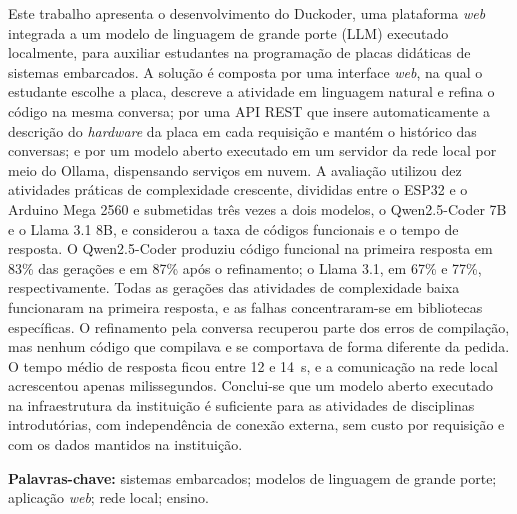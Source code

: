 
\begin{resumo}
  Este trabalho apresenta o desenvolvimento do Duckoder, uma plataforma \textit{web} integrada a um modelo de linguagem de grande porte (LLM) executado localmente, para auxiliar estudantes na programação de placas didáticas de sistemas embarcados. A solução é composta por uma interface \textit{web}, na qual o estudante escolhe a placa, descreve a atividade em linguagem natural e refina o código na mesma conversa; por uma API REST que insere automaticamente a descrição do \textit{hardware} da placa em cada requisição e mantém o histórico das conversas; e por um modelo aberto executado em um servidor da rede local por meio do Ollama, dispensando serviços em nuvem. A avaliação utilizou dez atividades práticas de complexidade crescente, divididas entre o ESP32 e o Arduino Mega 2560 e submetidas três vezes a dois modelos, o Qwen2.5-Coder 7B e o Llama 3.1 8B, e considerou a taxa de códigos funcionais e o tempo de resposta. O Qwen2.5-Coder produziu código funcional na primeira resposta em 83\% das gerações e em 87\% após o refinamento; o Llama 3.1, em 67\% e 77\%, respectivamente. Todas as gerações das atividades de complexidade baixa funcionaram na primeira resposta, e as falhas concentraram-se em bibliotecas específicas. O refinamento pela conversa recuperou parte dos erros de compilação, mas nenhum código que compilava e se comportava de forma diferente da pedida. O tempo médio de resposta ficou entre 12 e 14~s, e a comunicação na rede local acrescentou apenas milissegundos. Conclui-se que um modelo aberto executado na infraestrutura da instituição é suficiente para as atividades de disciplinas introdutórias, com independência de conexão externa, sem custo por requisição e com os dados mantidos na instituição.

  \vspace{\onelineskip}

  \noindent\textbf{Palavras-chave:} sistemas embarcados; modelos de linguagem de grande porte; aplicação \textit{web}; rede local; ensino.
\end{resumo}

